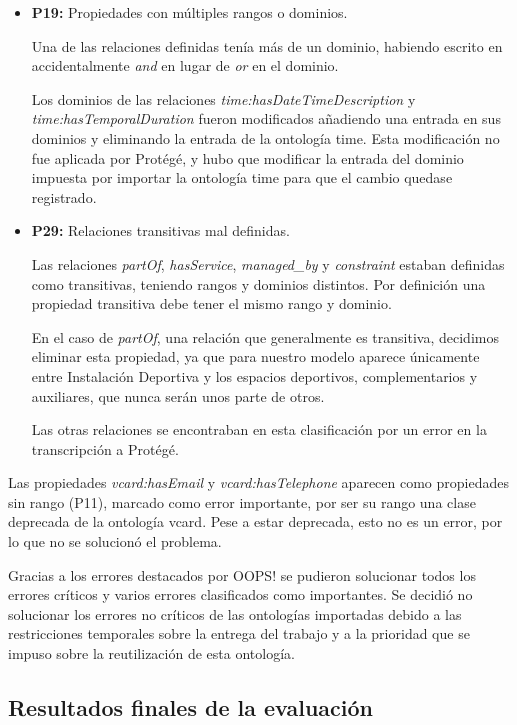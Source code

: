 \documentclass[a4paper,12pt]{article}
\begin{document}
	\begin{itemize}
		\item \textbf{P19:} Propiedades con múltiples rangos o dominios.
		
		Una de las relaciones definidas tenía más de un dominio, habiendo escrito en  accidentalmente \textit{and} en lugar de \textit{or} en el dominio.
		
		Los dominios de las relaciones \textit{time:hasDateTimeDescription} y \textit{time:hasTemporalDuration} fueron modificados añadiendo una entrada en sus dominios y eliminando la entrada de la ontología time. Esta modificación no fue aplicada por Protégé, y hubo que modificar la entrada del dominio impuesta por importar la ontología time para que el cambio quedase registrado.
		
		\item \textbf{P29:} Relaciones transitivas mal definidas.
		
		Las relaciones \textit{partOf}, \textit{hasService}, \textit{managed\_by} y \textit{constraint} estaban definidas como transitivas, teniendo rangos y dominios distintos. Por definición una propiedad transitiva debe tener el mismo rango y dominio.
		
		En el caso de \textit{partOf}, una relación que generalmente es transitiva, decidimos eliminar esta propiedad, ya que para nuestro modelo aparece únicamente entre Instalación Deportiva y los espacios deportivos, complementarios y auxiliares, que nunca serán unos parte de otros.
		
		Las otras relaciones se encontraban en esta clasificación por un error en la transcripción a Protégé.
	\end{itemize}
	
	Las propiedades \textit{vcard:hasEmail} y \textit{vcard:hasTelephone} aparecen como propiedades sin rango (P11), marcado como error importante, por ser su rango una clase deprecada de la ontología vcard. Pese a estar deprecada, esto no es un error, por lo que no se solucionó el problema.
	
	Gracias a los errores destacados por OOPS! se pudieron solucionar todos los errores críticos y varios errores clasificados como importantes. Se decidió no solucionar los errores no críticos de las ontologías importadas debido a las restricciones temporales sobre la entrega del trabajo y a la prioridad que se impuso sobre la reutilización de esta ontología.
	
	\subsection{Resultados finales de la evaluación}
	
\end{document}
